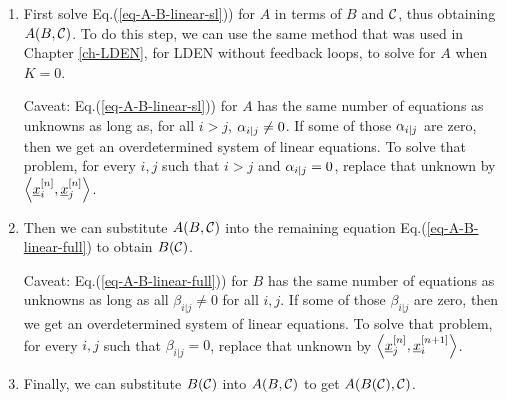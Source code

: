 \begin{enumerate}
\item First solve
Eq.(\ref{eq-A-B-linear-sl})) for $A$ in terms of $B$ and ${\cal C}$, thus obtaining $A(B,
{\cal C})$.
To do this step,
we can use the same method that was used
in Chapter \ref{ch-LDEN},
for LDEN without feedback loops, to solve for
$A$ when $K= 0$.
 
Caveat: Eq.(\ref{eq-A-B-linear-sl})) for $A$ has the same number of equations as unknowns as long as, for all $i>j$,
$\alpha_{i|j}\neq 0$. If some of those $\alpha_{i|j}$ are zero, then we get an
overdetermined system of linear equations.
To solve that problem, for every 
$i, j$ such that $i>j$ and  $\alpha_{i|j}= 0$,
replace that unknown by $\av{\rvx_i^{[n]},
\rvx_j^{[n]}}$.

\item Then we can substitute $A(B, {\cal C})$ into the remaining equation
Eq.(\ref{eq-A-B-linear-full})
to obtain $B({\cal C})$. 

Caveat: Eq.(\ref{eq-A-B-linear-full})) for $B$ has the same number of equations as unknowns as long as
all $\beta_{i|j}\neq 0$ for all $i,j$. If some of those $\beta_{i|j}$ are zero, then we get an
overdetermined system of linear equations.
To solve that problem, for every 
$i, j$ such that $\beta_{i|j}= 0$,
replace that unknown by $\av{\rvx_j^{[n]},
\rvx_i^{[n+1]}}$.

\item Finally, we can substitute $B({\cal C})$ into $A(B,
{\cal C})$ to get $A(B({\cal C}), {\cal C})$.
\end{enumerate}
 
 


